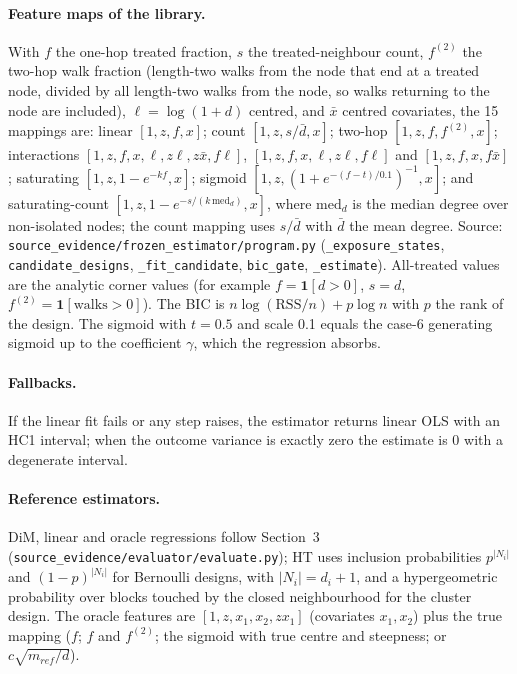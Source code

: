 \documentclass{article}
\begin{document}
\paragraph{Feature maps of the library.} With $f$ the one-hop treated fraction, $s$ the treated-neighbour count, $f^{(2)}$ the two-hop walk fraction (length-two walks from the node that end at a treated node, divided by all length-two walks from the node, so walks returning to the node are included), $\ell=\log(1+d)$ centred, and $\bar x$ centred covariates, the 15 mappings are: linear $[1,z,f,x]$; count $[1,z,s/\bar d,x]$; two-hop $[1,z,f,f^{(2)},x]$; interactions $[1,z,f,x,\ell,z\ell,z\bar x,f\ell]$, $[1,z,f,x,\ell,z\ell,f\ell]$ and $[1,z,f,x,f\bar x]$; saturating $[1,z,1-e^{-kf},x]$; sigmoid $[1,z,(1+e^{-(f-t)/0.1})^{-1},x]$; and saturating-count $[1,z,1-e^{-s/(k\,\mathrm{med}_d)},x]$, where $\mathrm{med}_d$ is the median degree over non-isolated nodes; the count mapping uses $s/\bar d$ with $\bar d$ the mean degree. Source: \texttt{source\_evidence/frozen\_estimator/program.py} (\texttt{\_exposure\_states}, \texttt{candidate\_designs}, \texttt{\_fit\_candidate}, \texttt{bic\_gate}, \texttt{\_estimate}). All-treated values are the analytic corner values (for example $f=\mathbf 1[d>0]$, $s=d$, $f^{(2)}=\mathbf 1[\text{walks}>0]$). The BIC is $n\log(\mathrm{RSS}/n)+p\log n$ with $p$ the rank of the design. The sigmoid with $t=0.5$ and scale 0.1 equals the case-6 generating sigmoid up to the coefficient $\gamma$, which the regression absorbs.

\paragraph{Fallbacks.} If the linear fit fails or any step raises, the estimator returns linear OLS with an HC1 interval; when the outcome variance is exactly zero the estimate is 0 with a degenerate interval.

\paragraph{Reference estimators.} DiM, linear and oracle regressions follow Section~3 (\texttt{source\_evidence/evaluator/evaluate.py}); HT uses inclusion probabilities $p^{|N_i|}$ and $(1-p)^{|N_i|}$ for Bernoulli designs, with $|N_i|=d_i+1$, and a hypergeometric probability over blocks touched by the closed neighbourhood for the cluster design. The oracle features are $[1,z,x_1,x_2,zx_1]$ (covariates $x_1,x_2$) plus the true mapping ($f$; $f$ and $f^{(2)}$; the sigmoid with true centre and steepness; or $c\sqrt{m_{ref}/d}$).
\end{document}
